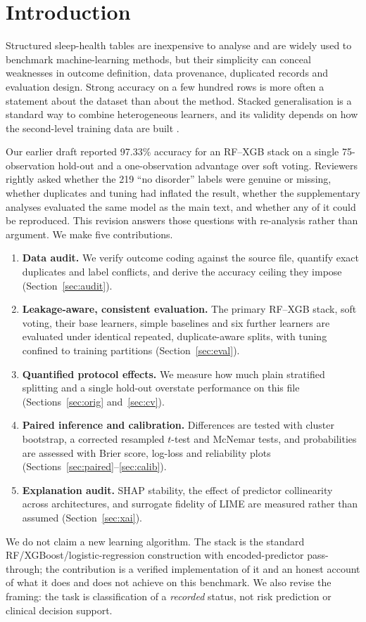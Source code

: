 \documentclass[11pt,a4paper]{article}
\begin{document}
\section{Introduction}
Structured sleep-health tables are inexpensive to analyse and are widely used to benchmark machine-learning methods, but their simplicity can conceal weaknesses in outcome definition, data provenance, duplicated records and evaluation design. Strong accuracy on a few hundred rows is more often a statement about the dataset than about the method. Stacked generalisation \citep{wolpert1992} is a standard way to combine heterogeneous learners, and its validity depends on how the second-level training data are built \citep{kapoor2023,efthimiou2024}.

Our earlier draft reported 97.33\% accuracy for an RF--XGB stack on a single 75-observation hold-out and a one-observation advantage over soft voting. Reviewers rightly asked whether the 219 ``no disorder'' labels were genuine or missing, whether duplicates and tuning had inflated the result, whether the supplementary analyses evaluated the same model as the main text, and whether any of it could be reproduced. This revision answers those questions with re-analysis rather than argument. We make five contributions.
\begin{enumerate}
\item \textbf{Data audit.} We verify outcome coding against the source file, quantify exact duplicates and label conflicts, and derive the accuracy ceiling they impose (Section~\ref{sec:audit}).
\item \textbf{Leakage-aware, consistent evaluation.} The primary RF--XGB stack, soft voting, their base learners, simple baselines and six further learners are evaluated under identical repeated, duplicate-aware splits, with tuning confined to training partitions (Section~\ref{sec:eval}).
\item \textbf{Quantified protocol effects.} We measure how much plain stratified splitting and a single hold-out overstate performance on this file (Sections~\ref{sec:orig} and~\ref{sec:cv}).
\item \textbf{Paired inference and calibration.} Differences are tested with cluster bootstrap, a corrected resampled $t$-test and McNemar tests, and probabilities are assessed with Brier score, log-loss and reliability plots (Sections~\ref{sec:paired}--\ref{sec:calib}).
\item \textbf{Explanation audit.} SHAP stability, the effect of predictor collinearity across architectures, and surrogate fidelity of LIME are measured rather than assumed (Section~\ref{sec:xai}).
\end{enumerate}
We do not claim a new learning algorithm. The stack is the standard RF/XGBoost/logistic-regression construction with encoded-predictor pass-through; the contribution is a verified implementation of it and an honest account of what it does and does not achieve on this benchmark. We also revise the framing: the task is classification of a \emph{recorded} status, not risk prediction or clinical decision support.
\end{document}
